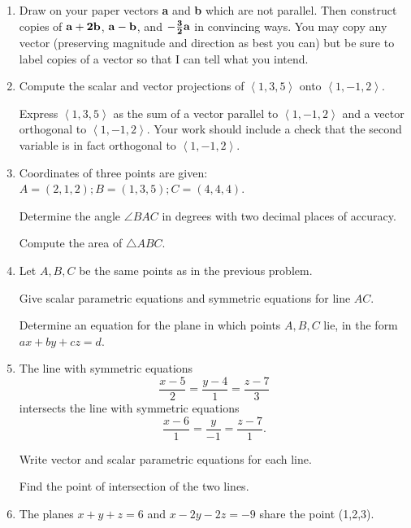 \documentclass[12pt]{article}
\begin{document}
\begin{enumerate}

\item  Draw on your paper vectors {\bf a} and {\bf b} which are not parallel.  Then construct copies of ${\bf a+2b}$, ${\bf a-b}$, and ${\bf -\frac32 a}$ in convincing ways.  You may copy any vector (preserving magnitude and direction as best you can) but be sure to label copies of a vector so that I can tell what you intend.

\newpage

\item   Compute the scalar and vector projections of $\left<1,3,5\right>$ onto $\left<1,-1,2\right>$.

Express $\left<1,3,5\right>$ as the sum of a vector parallel to $\left<1,-1,2\right>$ and a vector orthogonal to $\left<1,-1,2\right>$.  Your work should include a check that the second variable is in fact orthogonal to $\left<1,-1,2     \right>$.

\newpage

\item     Coordinates of three points are given:  $A = (2,1,2);  B = (1,3,5);  C = (4,4,4)$.        

Determine the angle $\angle BAC$ in degrees with two decimal places of accuracy.

Compute the area of $\triangle ABC$.    

\newpage

\item  Let $A,B,C$ be the same points as in the previous problem.

Give scalar parametric equations and symmetric equations for line $AC$.

Determine an equation for the plane in which points $A,B,C$ lie, in the form $ax+by+cz = d$.

\newpage

\item  The line with symmetric equations $$\frac{x-5}2 = \frac{y-4}1 = \frac{z-7}3$$
intersects the line with symmetric equations $$\frac{x-6}1 = \frac{y}{-1}=\frac{z-7}1.$$

Write vector and scalar parametric equations for each line.

Find the point of intersection of the two lines.

\newpage

\item  The planes $x+y+z=6$ and $x-2y-2z = -9$ share the point (1,2,3).


\end{enumerate}
\end{document}
